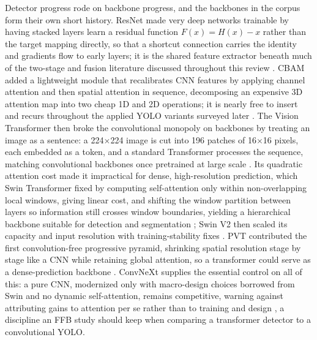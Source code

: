 Detector progress rode on backbone progress, and the backbones in the corpus form their own short history. ResNet made very deep networks trainable by having stacked layers learn a residual function $F(x)=H(x)-x$ rather than the target mapping directly, so that a shortcut connection carries the identity and gradients flow to early layers; it is the shared feature extractor beneath much of the two-stage and fusion literature discussed throughout this review \cite{he2016resnet}. CBAM added a lightweight module that recalibrates CNN features by applying channel attention and then spatial attention in sequence, decomposing an expensive 3D attention map into two cheap 1D and 2D operations; it is nearly free to insert and recurs throughout the applied YOLO variants surveyed later \cite{woo2018cbam}. The Vision Transformer then broke the convolutional monopoly on backbones by treating an image as a sentence: a 224$\times$224 image is cut into 196 patches of 16$\times$16 pixels, each embedded as a token, and a standard Transformer processes the sequence, matching convolutional backbones once pretrained at large scale \cite{dosovitskiy2021vit}. Its quadratic attention cost made it impractical for dense, high-resolution prediction, which Swin Transformer fixed by computing self-attention only within non-overlapping local windows, giving linear cost, and shifting the window partition between layers so information still crosses window boundaries, yielding a hierarchical backbone suitable for detection and segmentation \cite{liu2021swin}; Swin V2 then scaled its capacity and input resolution with training-stability fixes \cite{liu2022swinv2}. PVT contributed the first convolution-free progressive pyramid, shrinking spatial resolution stage by stage like a CNN while retaining global attention, so a transformer could serve as a dense-prediction backbone \cite{wang2021pvt}. ConvNeXt supplies the essential control on all of this: a pure CNN, modernized only with macro-design choices borrowed from Swin and no dynamic self-attention, remains competitive, warning against attributing gains to attention per se rather than to training and design \cite{liu2022convnext}, a discipline an FFB study should keep when comparing a transformer detector to a convolutional YOLO.

